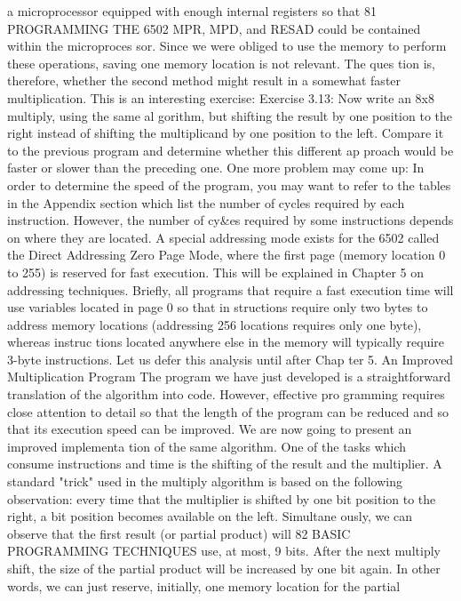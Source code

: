a microprocessor equipped with enough internal registers so that
81
PROGRAMMING THE 6502
MPR, MPD, and RESAD could be contained within the microproces
sor. Since we were obliged to use the memory to perform these
operations, saving one memory location is not relevant. The ques
tion is, therefore, whether the second method might result in a
somewhat faster multiplication. This is an interesting exercise:
Exercise 3.13: Now write an 8x8 multiply, using the same al
gorithm, but shifting the result by one position to the right instead of
shifting the multiplicand by one position to the left. Compare it to
the previous program and determine whether this different ap
proach would be faster or slower than the preceding one.
One more problem may come up: In order to determine the
speed of the program, you may want to refer to the tables in the
Appendix section which list the number of cycles required by
each instruction. However, the number of cy&es required by
some instructions depends on where they are located. A special
addressing mode exists for the 6502 called the Direct Addressing
Zero Page Mode, where the first page (memory location 0 to 255)
is reserved for fast execution. This will be explained in Chapter 5
on addressing techniques. Briefly, all programs that require a
fast execution time will use variables located in page 0 so that in
structions require only two bytes to address memory locations
(addressing 256 locations requires only one byte), whereas instruc
tions located anywhere else in the memory will typically require
3-byte instructions. Let us defer this analysis until after Chap
ter 5.
An Improved Multiplication Program
The program we have just developed is a straightforward
translation of the algorithm into code. However, effective pro
gramming requires close attention to detail so that the length of
the program can be reduced and so that its execution speed can be
improved. We are now going to present an improved implementa
tion of the same algorithm.
One of the tasks which consume instructions and time is the
shifting of the result and the multiplier. A standard "trick" used
in the multiply algorithm is based on the following observation:
every time that the multiplier is shifted by one bit position to the
right, a bit position becomes available on the left. Simultane
ously, we can observe that the first result (or partial product) will
82
BASIC PROGRAMMING TECHNIQUES
use, at most, 9 bits. After the next multiply shift, the size of the
partial product will be increased by one bit again. In other words,
we can just reserve, initially, one memory location for the partial
